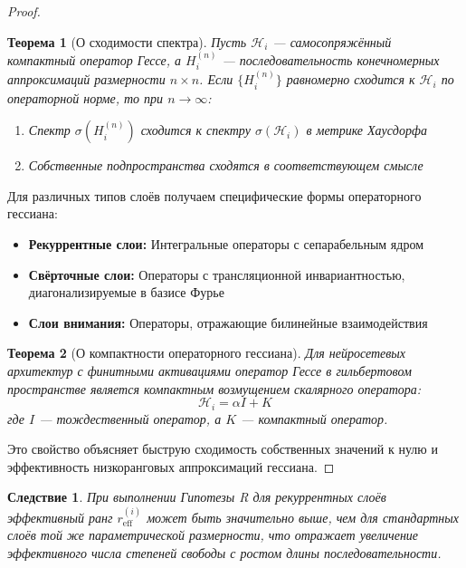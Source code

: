 \documentclass[a4paper,12pt]{article}
\newtheorem{theorem}{Теорема}
\newtheorem{corollary}{Следствие}
\begin{document}
\begin{proof}
    \begin{theorem}[О сходимости спектра]
    Пусть $\mathcal{H}_i$ — самосопряжённый компактный оператор Гессе, а $H_i^{(n)}$ — последовательность конечномерных аппроксимаций размерности $n \times n$. Если $\{H_i^{(n)}\}$ равномерно сходится к $\mathcal{H}_i$ по операторной норме, то при $n \to \infty$:
    \begin{enumerate}
    \item Спектр $\sigma(H_i^{(n)})$ сходится к спектру $\sigma(\mathcal{H}_i)$ в метрике Хаусдорфа
    \item Собственные подпространства сходятся в соответствующем смысле
    \end{enumerate}
    \end{theorem}
    
    Для различных типов слоёв получаем специфические формы операторного гессиана:
    \begin{itemize}
    \item \textbf{Рекуррентные слои:} Интегральные операторы с сепарабельным ядром
    \item \textbf{Свёрточные слои:} Операторы с трансляционной инвариантностью, диагонализируемые в базисе Фурье
    \item \textbf{Слои внимания:} Операторы, отражающие билинейные взаимодействия
    \end{itemize}
    
    \begin{theorem}[О компактности операторного гессиана]
    Для нейросетевых архитектур с финитными активациями оператор Гессе в гильбертовом пространстве является компактным возмущением скалярного оператора:
    \begin{equation}
    \mathcal{H}_i = \alpha I + K
    \end{equation}
    где $I$ — тождественный оператор, а $K$ — компактный оператор.
    \end{theorem}
    
    Это свойство объясняет быструю сходимость собственных значений к нулю и эффективность низкоранговых аппроксимаций гессиана.
    \end{proof}
    
    \begin{corollary}
    При выполнении Гипотезы R для рекуррентных слоёв эффективный ранг $r_{\text{eff}}^{(i)}$ может быть значительно выше, чем для стандартных слоёв той же параметрической размерности, что отражает увеличение эффективного числа степеней свободы с ростом длины последовательности.
    \end{corollary}
    
\end{document}
